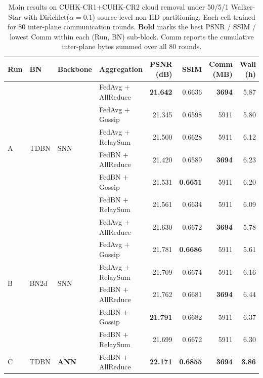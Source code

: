 %
%

\begin{table}[t]
\centering
\caption{Main results on CUHK-CR1$+$CUHK-CR2 cloud removal under
50/5/1 Walker-Star with Dirichlet($\alpha\!=\!0.1$) source-level
non-IID partitioning. Each cell trained for 80 inter-plane communication
rounds. \textbf{Bold} marks the best PSNR / SSIM / lowest Comm within
each (Run, BN) sub-block. Comm reports the cumulative inter-plane
bytes summed over all 80 rounds.}
\label{tab:main_results_v2}
\renewcommand{\arraystretch}{1.10}
\setlength{\tabcolsep}{4.5pt}
\begin{tabular}{l l l l r r r r}
\toprule
Run & BN & Backbone & Aggregation & PSNR (dB) & SSIM & Comm (MB) & Wall (h) \\
\midrule
\multirow{6}{*}{A}
  & \multirow{6}{*}{TDBN}
  & \multirow{6}{*}{SNN}
  & FedAvg $+$ AllReduce  & \textbf{21.642}  & 0.6636          & \textbf{3694} & 5.87 \\
  & & & FedAvg $+$ Gossip   & 21.345           & 0.6598          & 5911          & 5.80 \\
  & & & FedAvg $+$ RelaySum & 21.500           & 0.6628          & 5911          & 6.12 \\
\cmidrule(lr){4-8}
  & & & FedBN  $+$ AllReduce & 21.420          & 0.6589          & \textbf{3694} & 6.23 \\
  & & & FedBN  $+$ Gossip    & 21.531          & \textbf{0.6651} & 5911          & 6.20 \\
  & & & FedBN  $+$ RelaySum  & 21.561          & 0.6634          & 5911          & 6.09 \\
\midrule
\multirow{6}{*}{B}
  & \multirow{6}{*}{BN2d}
  & \multirow{6}{*}{SNN}
  & FedAvg $+$ AllReduce  & 21.630           & 0.6672          & \textbf{3694} & 5.78 \\
  & & & FedAvg $+$ Gossip   & 21.781           & \textbf{0.6686} & 5911          & 5.61 \\
  & & & FedAvg $+$ RelaySum & 21.709           & 0.6674          & 5911          & 6.16 \\
\cmidrule(lr){4-8}
  & & & FedBN  $+$ AllReduce & 21.762          & 0.6681          & \textbf{3694} & 6.44 \\
  & & & FedBN  $+$ Gossip    & \textbf{21.791} & 0.6682          & 5911          & 6.37 \\
  & & & FedBN  $+$ RelaySum  & 21.699          & 0.6672          & 5911          & 6.30 \\
\midrule
C & TDBN & \textbf{ANN} & FedBN $+$ AllReduce
  & \textbf{22.171} & \textbf{0.6855} & \textbf{3694} & \textbf{3.86} \\
\bottomrule
\end{tabular}
\end{table}
